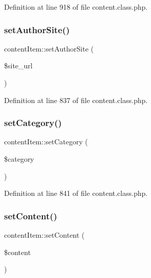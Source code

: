Definition at line 918 of file content.\+class.\+php.

\mbox{\label{classcontentItem_af28f4f40f1ac95cee2d88fe1e7d4b683}} 
\subsubsection{\texorpdfstring{set\+Author\+Site()}{setAuthorSite()}}
{\footnotesize\ttfamily content\+Item\+::set\+Author\+Site (\begin{DoxyParamCaption}\item[{}]{\$site\+\_\+url }\end{DoxyParamCaption})}



Definition at line 837 of file content.\+class.\+php.

\mbox{\label{classcontentItem_aa8ba578ae6629d632a42a76da823c59f}} 
\subsubsection{\texorpdfstring{set\+Category()}{setCategory()}}
{\footnotesize\ttfamily content\+Item\+::set\+Category (\begin{DoxyParamCaption}\item[{}]{\$category }\end{DoxyParamCaption})}



Definition at line 841 of file content.\+class.\+php.

\mbox{\label{classcontentItem_ad7355ad724398f4fbc79832241767405}} 
\subsubsection{\texorpdfstring{set\+Content()}{setContent()}}
{\footnotesize\ttfamily content\+Item\+::set\+Content (\begin{DoxyParamCaption}\item[{}]{\$content }\end{DoxyParamCaption})}



